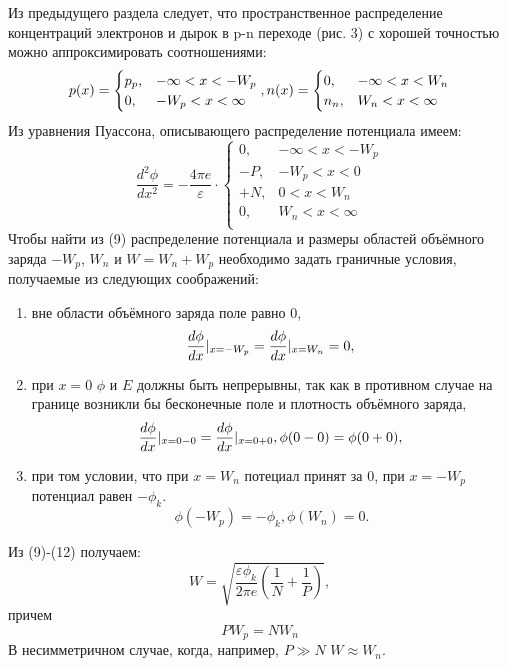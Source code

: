 \documentclass[a4paper]{article}
\begin{document}
Из предыдущего раздела следует, что пространственное распределение концентраций электронов и дырок в p-n переходе (рис. 3) с хорошей точностью можно аппроксимировать соотношениями:
\begin{equation}
p(x) = \begin{cases} p_p, &  -\infty < x < -W_p \\ 0, & -W_p < x < \infty \end{cases}, \\
n(x) = \begin{cases} 0, &  -\infty < x < W_n \\ n_n, & W_n < x < \infty \end{cases}
\end{equation}
Из уравнения Пуассона, описывающего распределение потенциала имеем:
\begin{equation}
    \frac{d^2 \phi}{dx^2} = -\frac{4\pi e}{\varepsilon} \cdot \begin{cases}
    0, & -\infty < x < -W_p \\
    -P, & -W_p < x < 0 \\
    +N, & 0 < x < W_n \\
    0, & W_n < x < \infty \\
    \end{cases}
\end{equation}
Чтобы найти из (9) распределение  потенциала и размеры областей объёмного заряда $-W_p$, $W_n$ и $W = W_n + W_p$ необходимо задать граничные условия, получаемые из следующих соображений:
\begin{enumerate}
    \item вне области объёмного заряда поле равно 0,
    \begin{equation}
        \frac{d\phi}{dx}|_{x=-W_p}=\frac{d\phi}{dx}|_{x=W_n}=0,\\
    \end{equation}
    \item при $x=0$ $\phi$ и $E$ должны быть непрерывны, так как в противном случае на границе возникли бы бесконечные поле и плотность объёмного заряда,
    \begin{equation}
        \frac{d\phi}{dx}|_{x=0-0}=\frac{d\phi}{dx}|_{x=0+0}, \phi(0-0) = \phi(0+0), \\
    \end{equation}
    \item при том условии, что при $x=W_n$ потециал принят за 0, при $x=-W_p$ потенциал равен $-\phi_k$.
    \begin{equation}
        \phi(-W_p)=-\phi_k, \phi(W_n) = 0.
    \end{equation}
    \end{enumerate}
    Из (9)-(12) получаем:
    \begin{equation}
    W = \sqrt{\frac{\varepsilon \phi_k}{2\pi e}(\frac{1}{N}+\frac{1}{P})},
    \end{equation}
    причем
    \begin{equation}
        PW_p=NW_n
    \end{equation}
    В несимметричном случае, когда, например, $P \gg N$ $W \approx W_n$.
    
\end{document}
